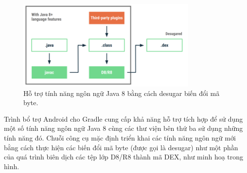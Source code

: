 \begin{flushleft}
        \begin{figure}[H] 
            \centering
            \includegraphics[width=0.8\textwidth]{images/javainandroid.png}
            \caption{Hỗ trợ tính năng ngôn ngữ Java 8 bằng cách desugar biến đổi mã byte.}
            \label{fig:android}
        \end{figure}
        \hspace*{0.8cm}Trình bổ trợ Android cho Gradle cung cấp khả năng hỗ trợ tích hợp để sử dụng một số tính năng ngôn ngữ Java 8 cùng các thư viện bên thứ ba sử dụng những tính năng đó. Chuỗi công cụ mặc định triển khai các tính năng ngôn ngữ mới bằng cách thực hiện các biến đổi mã byte (được gọi là desugar) như một phần của quá trình biên dịch các tệp lớp D8/R8 thành mã DEX, như minh hoạ trong hình.
    \end{flushleft}

